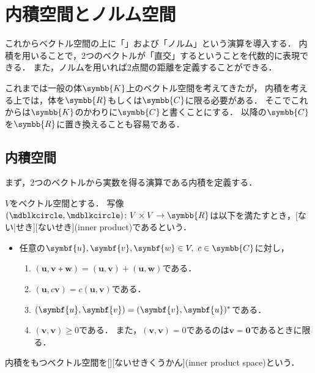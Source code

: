 \documentclass[../sotsu.tex]{subfiles}
\begin{document}
\section{内積空間とノルム空間}

これからベクトル空間の上に「」および「ノルム」という演算を導入する．
内積を用いることで，2つのベクトルが「直交」するということを代数的に表現できる．
また，ノルムを用いれば2点間の距離を定義することができる．

これまでは一般の体$\symbb{K}$上のベクトル空間を考えてきたが，
内積を考える上では，体を$\symbb{R}$もしくは$\symbb{C}$に限る必要がある．
そこでこれからは$\symbb{K}$のかわりに$\symbb{C}$と書くことにする．
以降の$\symbb{C}$を$\symbb{R}$に置き換えることも容易である．


\subsection{内積空間}
\label{sec:inner-product-space}

まず，2つのベクトルから実数を得る演算である内積を定義する．

\begin{definition}[内積]
    \label{dfn:inner-product}
    $V$をベクトル空間とする．
    写像$({\bigdot}, {\bigdot}) \colon V \times V \to \symbb{R}$は以下を満たすとき，[ない|せき][ないせき](inner product)であるという．
    \begin{itemize}
        \item 任意の$\symbf{u}, \symbf{v}, \symbf{w} \in V, \  c \in \symbb{C}$に対し，
        \begin{enumerate}
            \item \label{innerp:sum} $(\symbf{u}, \symbf{v} \tplus \symbf{w}) = (\symbf{u}, \symbf{v}) + (\symbf{u}, \symbf{w})$である．
            \item \label{innerp:scalar} $(\symbf{u}, c\symbf{v}) = c(\symbf{u}, \symbf{v})$である．
            \item \label{innerp:conjugate-symmetry} $(\symbf{u}, \symbf{v}) = \conj{(\symbf{v}, \symbf{u})}$である．
            \item \label{innerp:positive-definiteness}$(\symbf{v}, \symbf{v}) \geq 0$である．
                また，$(\symbf{v}, \symbf{v}) = 0$であるのは$\symbf{v} = \symbf{0}$であるときに限る．
        \end{enumerate}
    \end{itemize}
    内積をもつベクトル空間を[][ないせきくうかん](inner product space)という．
\end{definition}
\end{document}
